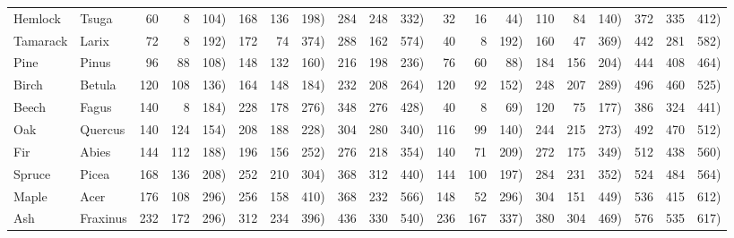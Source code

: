 \begin{landscape}
\begin{table}
\begin{center}
\begin{tabular}{ll*{6}{r@{ (}r@{, }r}}
Hemlock& Tsuga & 60 &   8 & 104) & 168 & 136 & 198) & 284 & 248 & 332)&32 &  16 &  44) & 110 &  84 & 140) & 372 & 335 & 412) \\
Tamarack & Larix & 72 &   8 & 192) & 172 &  74 & 374) & 288 & 162 & 574)&40 &   8 & 192) & 160 &  47 & 369) & 442 & 281 & 582) \\
Pine & Pinus & 96 &  88 & 108) & 148 & 132 & 160) & 216 & 198 & 236)&76 &  60 &  88) & 184 & 156 & 204) & 444 & 408 & 464) \\
Birch & Betula & 120 & 108 & 136) & 164 & 148 & 184) & 232 & 208 & 264)&120 &  92 & 152) & 248 & 207 & 289) & 496 & 460 & 525) \\
Beech & Fagus & 140 &   8 & 184) & 228 & 178 & 276) & 348 & 276 & 428)&40 &   8 &  69) & 120 &  75 & 177) & 386 & 324 & 441) \\
Oak & Quercus & 140 & 124 & 154) & 208 & 188 & 228) & 304 & 280 & 340)&116 &  99 & 140) & 244 & 215 & 273) & 492 & 470 & 512) \\
Fir & Abies & 144 & 112 & 188) & 196 & 156 & 252) & 276 & 218 & 354)&140 &  71 & 209) & 272 & 175 & 349) & 512 & 438 & 560) \\
Spruce & Picea & 168 & 136 & 208) & 252 & 210 & 304) & 368 & 312 & 440)&144 & 100 & 197) & 284 & 231 & 352) & 524 & 484 & 564) \\
Maple & Acer & 176 & 108 & 296) & 256 & 158 & 410) & 368 & 232 & 566)&148 &  52 & 296) & 304 & 151 & 449) & 536 & 415 & 612) \\
Ash& Fraxinus & 232 & 172 & 296) & 312 & 234 & 396) & 436 & 330 & 540)&236 & 167 & 337) & 380 & 304 & 469) & 576 & 535 & 617) \\

\end{tabular}
\end{center}
\end{table}
\end{landscape}
